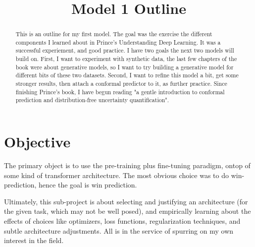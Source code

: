\documentclass[11pt]{article}
\title{Model 1 Outline}
\author{}
\date{}
\begin{document}
\maketitle

\begin{abstract}
    This is an outline for my first model. The goal was the exercise the different components I learned about in Prince's Understanding Deep Learning. It was a successful experiement, and good practice. I have two goals the next two models will build on.
    First, I want to experiment with synthetic data, the last few chapters of the book were about generative models, so I want to try building a generative model for different bits of these two datasets. Second, I want to refine this model a bit, get some stronger results, 
    then attach a conformal predictor to it, as further practice. Since finishing Prince's book, I have begun reading "a gentle introduction to conformal prediction and distribution-free uncertainty quantification".
\end{abstract}


\section{Objective}
    The primary object is to use the pre-training plus fine-tuning paradigm, ontop of some kind of transformer 
    architecture. The most obvious choice was to do win-prediction, hence the goal is win prediction. 

    Ultimately, this sub-project is about selecting and justifying an architecture (for the given task, which may 
    not be well posed), and empirically learning about the effects of choices like optimizers, loss functions, 
    regularization techniques, and subtle architecture adjustments. All is in the service of spurring on my own 
    interest in the field.
\end{document}
